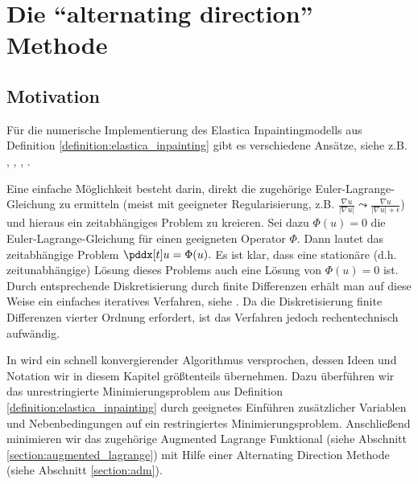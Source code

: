 \documentclass{mythesis}
\begin{document}
\chapter{Die “alternating direction” Methode} \label{chap:ad}


\section{Motivation} %


Für die numerische Implementierung des Elastica Inpaintingmodells aus Definition \ref{definition:elastica_inpainting} gibt es verschiedene Ansätze, siehe z.B. \cite{shen2002euler}, \cite{tai2011fast}, \cite{graphcuts}, \cite{normalstuff}.

Eine einfache Möglichkeit besteht darin, direkt die zugehörige Euler-Lagrange-Gleichung zu ermitteln (meist mit geeigneter Regularisierung, z.B. $\frac{\nabla u}{|\nabla u|} \leadsto \frac{\nabla u}{|\nabla u| + \epsilon}$) und hieraus ein zeitabhängiges Problem zu kreieren.
Sei dazu $\Phi(u) = 0$ die Euler-Lagrange-Gleichung für einen geeigneten Operator $\Phi$.
Dann lautet das zeitabhängige Problem
\begin{math}
    \pddx[t] u = \Phi(u).
\end{math}
Es ist klar, dass eine stationäre (d.h. zeitunabhängige) Lösung dieses Problems auch eine Lösung von $\Phi(u) = 0$ ist.
Durch entsprechende Diskretisierung durch finite Differenzen erhält man auf diese Weise ein einfaches iteratives Verfahren, siehe \cite{shen2002euler}.
Da die Diskretisierung finite Differenzen vierter Ordnung erfordert, ist das Verfahren jedoch rechentechnisch aufwändig.

In \cite{tai2011fast} wird ein schnell konvergierender Algorithmus versprochen, dessen Ideen und Notation wir in diesem Kapitel größtenteils übernehmen.
Dazu überführen wir das unrestringierte Minimierungsproblem aus Definition \ref{definition:elastica_inpainting} durch geeignetes Einführen zusätzlicher Variablen und Nebenbedingungen auf ein restringiertes Minimierungsproblem.
Anschließend minimieren wir das zugehörige Augmented Lagrange Funktional (siehe Abschnitt \ref{section:augmented_lagrange}) mit Hilfe einer Alternating Direction Methode (siehe Abschnitt \ref{section:adm}).
\end{document}
